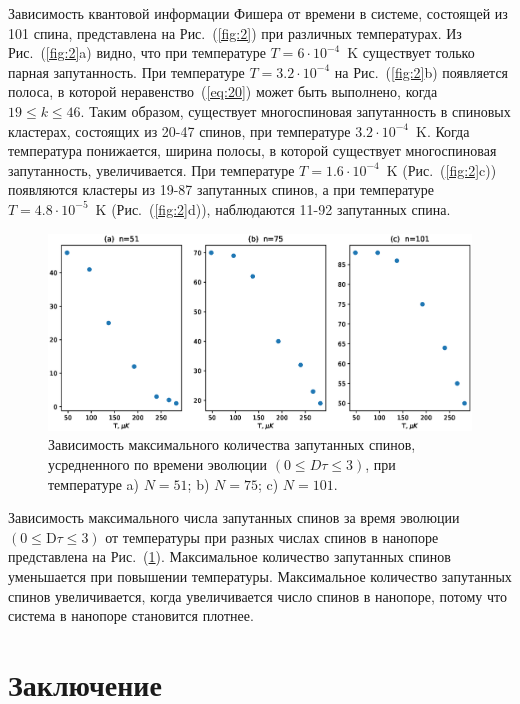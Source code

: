 \documentclass[utf8]{jetp}
\begin{document}
 Зависимость квантовой информации Фишера от времени в системе, состоящей из 101 спина, представлена на Рис.~(\ref{fig:2}) при различных температурах.
Из Рис.~(\ref{fig:2}a) видно, что при температуре $T=6\cdot10^{-4}$~K существует только парная запутанность.
При температуре $T=3.2\cdot10^{-4}$ на Рис.~(\ref{fig:2}b) появляется полоса, в которой неравенство~(\ref{eq:20}) может быть выполнено, когда $19 \leq k \leq 46$.
Таким образом, существует многоспиновая запутанность в спиновых кластерах, состоящих из 20-47 спинов, при температуре $3.2\cdot10^{-4}$~K.
Когда температура понижается, ширина полосы, в которой существует многоспиновая запутанность, увеличивается.
При температуре $T=1.6\cdot10^{-4}$~K (Рис.~(\ref{fig:2}c)) появляются кластеры из 19-87 запутанных спинов, а при температуре $T=4.8\cdot10^{-5}$~K (Рис.~(\ref{fig:2}d)), наблюдаются 11-92 запутанных спина.

\begin{figure}
 	\includegraphics[width=0.95\linewidth]{entangled_spins_by_n.eps}
	\caption{
	  Зависимость максимального количества запутанных спинов,
	  усредненного по времени эволюции $(0 \leq D\tau \leq 3)$,
	  при температуре a) $N=51$; b) $N=75$; c) $N=101$.
	}
	\label{fig:3}
\end{figure}

Зависимость максимального числа запутанных спинов за время эволюции $({0}\leq \mathrm{D}\tau\leq{3})$ от температуры при разных числах спинов в нанопоре представлена на Рис.~(\ref{fig:3}).
Максимальное количество запутанных спинов уменьшается при повышении температуры.
Максимальное количество запутанных спинов увеличивается, когда увеличивается число спинов в нанопоре, потому что система в нанопоре становится плотнее.



\section{Заключение}
\label{sec:6}
\end{document}
